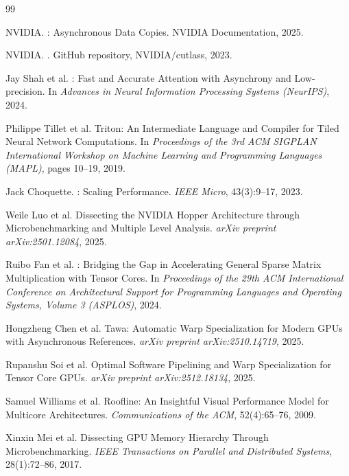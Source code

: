 \documentclass[10pt,twocolumn]{article}
\begin{document}
\begin{thebibliography}{99}
\small

{NVIDIA}.
: Asynchronous Data Copies.
\newblock NVIDIA Documentation, 2025.

{NVIDIA}.
.
\newblock GitHub repository, NVIDIA/cutlass, 2023.

Jay Shah et al.
: Fast and Accurate Attention with
  Asynchrony and Low-precision.
\newblock In \emph{Advances in Neural Information Processing Systems
  (NeurIPS)}, 2024.

Philippe Tillet et al.
\newblock Triton: An Intermediate Language and Compiler for Tiled
  Neural Network Computations.
\newblock In \emph{Proceedings of the 3rd ACM SIGPLAN International
  Workshop on Machine Learning and Programming Languages (MAPL)},
  pages 10--19, 2019.

Jack Choquette.
: Scaling Performance.
\newblock \emph{IEEE Micro}, 43(3):9--17, 2023.

Weile Luo et al.
\newblock Dissecting the {NVIDIA Hopper} Architecture through
  Microbenchmarking and Multiple Level Analysis.
\newblock \emph{arXiv preprint arXiv:2501.12084}, 2025.

Ruibo Fan et al.
: Bridging the Gap in Accelerating General Sparse
  Matrix Multiplication with Tensor Cores.
\newblock In \emph{Proceedings of the 29th ACM International Conference
  on Architectural Support for Programming Languages and Operating
  Systems, Volume 3 (ASPLOS)}, 2024.

Hongzheng Chen et al.
\newblock Tawa: Automatic Warp Specialization for Modern {GPUs} with
  Asynchronous References.
\newblock \emph{arXiv preprint arXiv:2510.14719}, 2025.

Rupanshu Soi et al.
\newblock Optimal Software Pipelining and Warp Specialization for
  Tensor Core {GPUs}.
\newblock \emph{arXiv preprint arXiv:2512.18134}, 2025.

Samuel Williams et al.
\newblock Roofline: An Insightful Visual Performance Model for
  Multicore Architectures.
\newblock \emph{Communications of the ACM}, 52(4):65--76, 2009.

Xinxin Mei et al.
\newblock Dissecting {GPU} Memory Hierarchy Through Microbenchmarking.
\newblock \emph{IEEE Transactions on Parallel and Distributed Systems},
  28(1):72--86, 2017.


\end{thebibliography}
\end{document}
